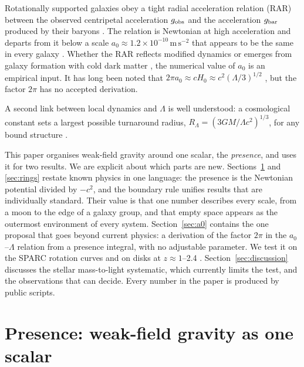 \documentclass[11pt]{article}
\newcommand{\unit}[1]{\,\mathrm{#1}}
\newcommand{\aunit}{\times10^{-10}\unit{m\,s^{-2}}}
\begin{document}
Rotationally supported galaxies obey a tight radial acceleration relation (RAR) between the observed centripetal acceleration $g_{\rm obs}$ and the acceleration $g_{\rm bar}$ produced by their baryons \citep{McGaugh2016,Lelli2017}. The relation is Newtonian at high acceleration and departs from it below a scale $a_0\approx1.2\aunit$ that appears to be the same in every galaxy \citep{Li2018}. Whether the RAR reflects modified dynamics \citep{Milgrom1983,FamaeyMcGaugh2012} or emerges from galaxy formation with cold dark matter \citep{KellerWadsley2017,Ludlow2017}, the numerical value of $a_0$ is an empirical input. It has long been noted that $2\pi a_0\approx cH_0\approx c^2(\Lambda/3)^{1/2}$ \citep{Milgrom1983,Milgrom1999,Milgrom2016}, but the factor $2\pi$ has no accepted derivation.

A second link between local dynamics and $\Lambda$ is well understood: a cosmological constant sets a largest possible turnaround radius, $R_\Lambda=(3GM/\Lambda c^2)^{1/3}$, for any bound structure \citep{PavlidouTomaras2014}.

This paper organises weak-field gravity around one scalar, the \emph{presence}, and uses it for two results. We are explicit about which parts are new. Sections~\ref{sec:presence} and \ref{sec:rings} restate known physics in one language: the presence is the Newtonian potential divided by $-c^2$, and the boundary rule unifies results that are individually standard. Their value is that one number describes every scale, from a moon to the edge of a galaxy group, and that empty space appears as the outermost environment of every system. Section~\ref{sec:a0} contains the one proposal that goes beyond current physics: a derivation of the factor $2\pi$ in the $a_0$--$\Lambda$ relation from a presence integral, with no adjustable parameter. We test it on the SPARC rotation curves \citep{Lelli2016} and on disks at $z\approx1$--2.4 \citep{Price2021}. Section~\ref{sec:discussion} discusses the stellar mass-to-light systematic, which currently limits the test, and the observations that can decide. Every number in the paper is produced by public scripts.

\section{Presence: weak-field gravity as one scalar}
\label{sec:presence}
\end{document}
